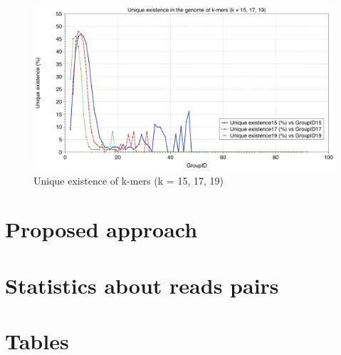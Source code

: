 \documentclass[11pt]{article}
\begin{document}
\begin{figure}
    \centering
    \includegraphics[scale=0.275]{image/UniqueExistencePlot.png}
    \caption{Unique existence of k-mers (k = 15, 17, 19)}
    \label{fig:U}
\end{figure}

\section{Proposed approach}\label{approach}

\section{Statistics about reads pairs}\label{pairs}

\clearpage

\appendix
\section{Tables}\label{append}
\end{document}
